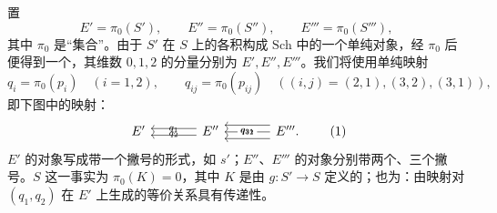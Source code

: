 置
\[
E'=\pi_0(S'),\qquad E''=\pi_0(S''),\qquad E'''=\pi_0(S'''),
\]
其中 $\pi_0$ 是“集合”。由于 $S'$ 在 $S$ 上的各积构成 $\mathrm{Sch}$ 中的一个单纯对象，经 $\pi_0$ 后便得到一个，其维数 $0,1,2$ 的分量分别为 $E',E'',E'''$。我们将使用单纯映射
\[
q_i=\pi_0(p_i)\quad(i=1,2),\qquad
q_{ij}=\pi_0(p_{ij})\quad((i,j)=(2,1),(3,2),(3,1)),
\]
即下图中的映射：
\[
\begin{tikzcd}[column sep=large]
E'&E''\arrow[l,shift left=.6ex,"q_1"']\arrow[l,shift right=.6ex,"q_2"]&E'''\arrow[l,shift left=1.2ex,"q_{21}"']\arrow[l,"q_{32}" description]\arrow[l,shift right=1.2ex,"q_{31}"] .
\end{tikzcd}\tag{1}
\]
$E'$ 的对象写成带一个撇号的形式，如 $s'$；$E''$、$E'''$ 的对象分别带两个、三个撇号。$S$ 这一事实为 $\pi_0(K)=0$，其中 $K$ 是由 $g:S'\to S$ 定义的；也为：由映射对 $(q_1,q_2)$ 在 $E'$ 上生成的等价关系具有传递性。

